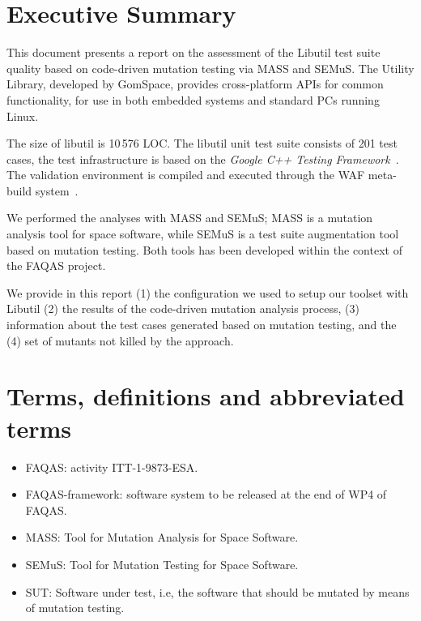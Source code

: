 
\chapter{Executive Summary}

This document presents a report on the assessment of the Libutil test suite quality based on code-driven mutation testing via MASS and SEMuS. The Utility Library, developed by GomSpace, provides cross-platform APIs for common functionality, for use in both embedded systems and standard PCs running Linux. 

The size of libutil is 10\,576 LOC. The libutil unit test suite consists of 201 test cases, the test infrastructure is based on the \emph{Google C++ Testing Framework}~\cite{googletest}. The validation environment is compiled and executed through the WAF meta-build system~\cite{waf}.

We performed the analyses with MASS and SEMuS; MASS is a mutation analysis tool for space software, while SEMuS is a test suite augmentation tool based on mutation testing. Both tools has been developed within the context of the FAQAS project.

We provide in this report (1) the configuration we used to setup our toolset with Libutil (2) the results of the code-driven mutation analysis process, (3) information about the test cases generated based on mutation testing, and the (4) set of mutants not killed by the approach.




\chapter{Terms, definitions and abbreviated terms}

\begin{itemize}
\item{FAQAS}: activity ITT-1-9873-ESA.
\item{FAQAS-framework}: software system to be released at the end of WP4 of FAQAS.
\item{MASS}: Tool for Mutation Analysis for Space Software.
\item{SEMuS}: Tool for Mutation Testing for Space Software.
\item{SUT}: Software under test, i.e, the software that should be mutated by means of mutation testing.

\end{itemize}

\clearpage
